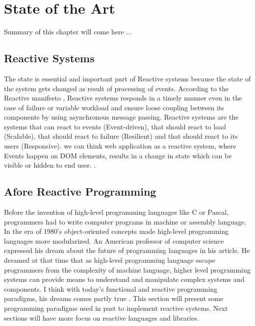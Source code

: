 \chapter{State of the Art} \label{chap:State of the Art}
Summary of this chapter will come here ... 

\section{Reactive Systems}
The state is essential and important part of Reactive systems because the state of the system gets changed as result of processing of events. According to the Reactive manifesto \citep{reactiveManifesto}, Reactive systems responds in a timely manner even in the case of failure or variable workload and ensure loose coupling between its components by using asynchronous message passing.
Reactive systems are the systems that can react to events (Event-driven), that should react to load (Scalable), that should react to failure (Resilient) and that should react to its users (Responsive). we can think web application as a reactive system, where Events happen on DOM \citep{W3DOM} elements, results in a change in state which can be visible or hidden to end user. \citep{Zanarini:2014:MRS:2637113.2637120}.

\section{Afore Reactive Programming}
Before the invention of high-level programming languages like C or Pascal, programmers had to write computer programs in machine or assembly language. In the era of 1980's object-oriented concepts made high-level programming languages more modularized. An American professor of computer science expressed his dream about the future of programming languages in his article. He dreamed at that time that as high-level programming language escape programmers from the complexity of machine language, higher level programming systems can provide means to understand and manipulate complex systems and components. I think with today's functional and reactive programming paradigms, his dreams comes partly true \citep{Winograd:1979:BPL:359131.359133}.
This section will present some programming paradigms used in past to implement reactive systems. Next sections will have more focus on reactive languages and libraries.

